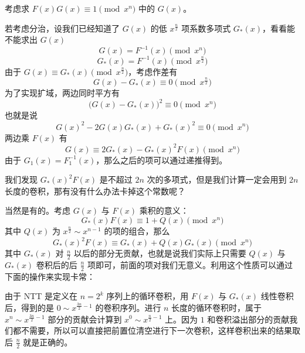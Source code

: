 考虑求 $F(x)G(x) \equiv 1 \pmod{x^n}$ 中的 $G(x)$。

若考虑分治，设我们已经知道了 $G(x)$ 的低 $x^{\frac{n}{2}}$ 项系数多项式 $G_*(x)$，看看能不能求出 $G(x)$
\[
G(x) = F^{-1}(x) \pmod{x^n}
\]
\[
G_*(x) = F^{-1}(x) \pmod{x^{\frac{n}{2}}}
\]
由于 $G(x) \equiv G_*(x) \pmod{x^{\frac{n}{2}}}$，考虑作差有
\[
G(x) - G_*(x) \equiv 0 \pmod{x^{\frac{n}{2}}}
\]
为了实现扩域，两边同时平方有
\[
\bigl(G(x) - G_*(x)\bigr)^2 \equiv 0 \pmod{x^n}
\]
也就是说
\[
G(x)^2 - 2G(x)G_*(x) + G_*(x)^2 \equiv 0 \pmod{x^n}
\]
两边乘 $F(x)$ 有
\[
G(x) \equiv 2G_*(x) - G_*(x)^2F(x) \pmod{x^n}
\]
由于 $G_1(x) = F_1^{-1}(x)$，那么之后的项可以通过递推得到。

我们发现 $G_*(x)^2F(x)$ 是不超过 $2n$ 次的多项式，但是我们计算一定会用到 $2n$ 长度的卷积，那有没有什么办法卡掉这个常数呢？

当然是有的。考虑 $G(x)$ 与 $F(x)$ 乘积的意义：
\[
G_*(x)F(x) \equiv 1 + Q(x) \pmod{x^n}
\]
其中 $Q(x)$ 为 $x^{\frac{n}{2}} \sim x^{n-1}$ 的项的组合，那么
\[
G_*(x)^2F(x) \equiv G_*(x) + Q(x)G_*(x) \pmod{x^n}
\]
其中 $G_*(x)$ 对 $\frac{n}{2}$ 以后的部分无贡献，也就是说我们实际上只需要 $Q(x)$ 与 $G_*(x)$ 卷积后的后 $\frac{n}{2}$ 项即可，前面的项对我们无意义。利用这个性质可以通过下面的操作来实现卡常：

由于 NTT 是定义在 $n = 2^k$ 序列上的循环卷积，用 $F(x)$ 与 $G_*(x)$ 线性卷积后，得到的是 $0 \sim x^{\frac{3n}{2}-1}$ 的卷积序列。进行 $n$ 长度的循环卷积时，属于 $x^{n} \sim x^{\frac{3n}{2}-1}$ 部分的贡献会计算到 $x^{0} \sim x^{\frac{n}{2}-1}$ 上。因为 $1$ 和卷积溢出部分的贡献我们都不需要，所以可以直接把前置位清空进行下一次卷积，这样卷积出来的结果取后 $\frac{n}{2}$ 就是正确的。